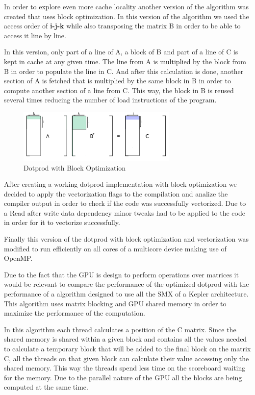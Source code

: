 \documentclass[a4paper]{report}
\begin{document}
In order to explore even more cache locality another version of the algorithm
was created that uses block optimization. In this version of the algorithm we
used the access order of \textbf{i-j-k} while also transposing the matrix B in
order to be able to access it line by line.

In this version, only part of a line of A, a block of B and part of a line of C
is kept in cache at any given time. The line from A is multiplied by the block
from B in order to populate the line in C. And after this calculation is done,
another section of A is fetched that is multiplied by the same block in B
in order to compute another section of a line from C. This way, the block in B
is reused several times reducing the number of load instructions of the program.

\begin{figure}[H]
    \centering
        \includegraphics[width=0.7\textwidth]{images/matrix_mult_block.png}
        \caption{Dotprod with Block Optimization}
\end{figure}

After creating a working dotprod implementation with block optimization we
decided to apply the vectorization flags to the compilation and analize the
compiler output in order to check if the code was successfully vectorized. Due
to a Read after write data dependency minor tweaks had to be applied to the code
in order for it to vectorize successfully.

Finally this version of the dotprod with block optimization and vectorization
was modified to run efficiently on all cores of a multicore device making use of
OpenMP.

Due to the fact that the GPU is design to perform operations over matrices it
would be relevant to compare the performance of the optimized dotprod with the
performance of a algorithm designed to use all the SMX of a Kepler architecture.
This algorithm uses matrix blocking and GPU shared memory in order to maximize
the performance of the computation.

In this algorithm each thread calculates a position of the C matrix. Since the
shared memory is shared within a given block and contains all the values needed
to calculate a temporary block that will be added to the final block on the
matrix C, all the threads on that given block can calculate their value
accessing only the shared memory. This way the threads spend less time on the
scoreboard waiting for the memory. Due to the parallel nature of the GPU all the
blocks are being computed at the same time.
\end{document}
